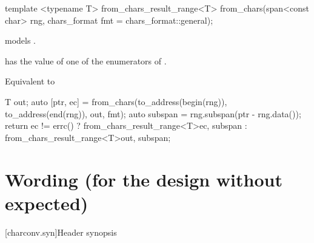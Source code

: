 \documentclass{wg21}
\begin{document}
\begin{addedblock}
\begin{itemdecl}
template <typename T>
from_chars_result_range<T> from_chars(span<const char> rng, chars_format fmt = chars_format::general);
\end{itemdecl}

\begin{itemdescr}
\pnum

\constraints {} models .

\expects
{} has the value of
one of the enumerators of .


\effects Equivalent to
\begin{codeblock}
    T out;
    auto [ptr, ec] = from_chars(to_address(begin(rng)),
                                to_address(end(rng)), out, fmt);
    auto subspan = rng.subspan(ptr - rng.data());
    return ec != errc()
        ? from_chars_result_range<T>{ec,  subspan}
        : from_chars_result_range<T>{out, subspan};
\end{codeblock}

\end{itemdescr}

\end{addedblock}

\section{Wording (for the design without expected)}

[charconv.syn]{Header  synopsis}
\end{document}
